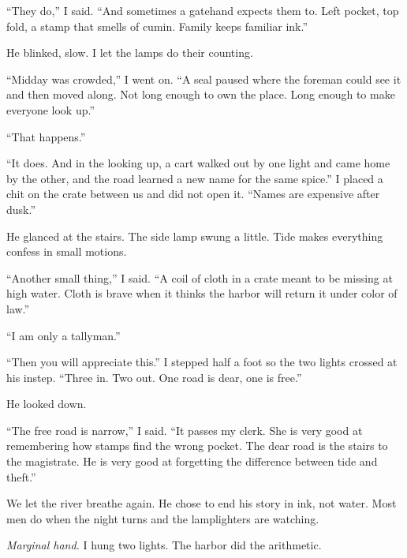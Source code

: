 \documentclass[11pt]{article}
\begin{document}
``They do,'' I said. ``And sometimes a gatehand expects them to. Left pocket, top fold, a stamp that smells of cumin. Family keeps familiar ink.''

He blinked, slow. I let the lamps do their counting.

``Midday was crowded,'' I went on. ``A seal paused where the foreman could see it and then moved along. Not long enough to own the place. Long enough to make everyone look up.''

``That happens.''

``It does. And in the looking up, a cart walked out by one light and came home by the other, and the road learned a new name for the same spice.'' I placed a chit on the crate between us and did not open it. ``Names are expensive after dusk.''

He glanced at the stairs. The side lamp swung a little. Tide makes everything confess in small motions.

``Another small thing,'' I said. ``A coil of cloth in a crate meant to be missing at high water. Cloth is brave when it thinks the harbor will return it under color of law.''

``I am only a tallyman.''

``Then you will appreciate this.'' I stepped half a foot so the two lights crossed at his instep. ``Three in. Two out. One road is dear, one is free.''

He looked down.

``The free road is narrow,'' I said. ``It passes my clerk. She is very good at remembering how stamps find the wrong pocket. The dear road is the stairs to the magistrate. He is very good at forgetting the difference between tide and theft.''

We let the river breathe again. He chose to end his story in ink, not water. Most men do when the night turns and the lamplighters are watching.

\medskip
\noindent\textit{Marginal hand.} I hung two lights. The harbor did the arithmetic.

\clearpage
\end{document}
